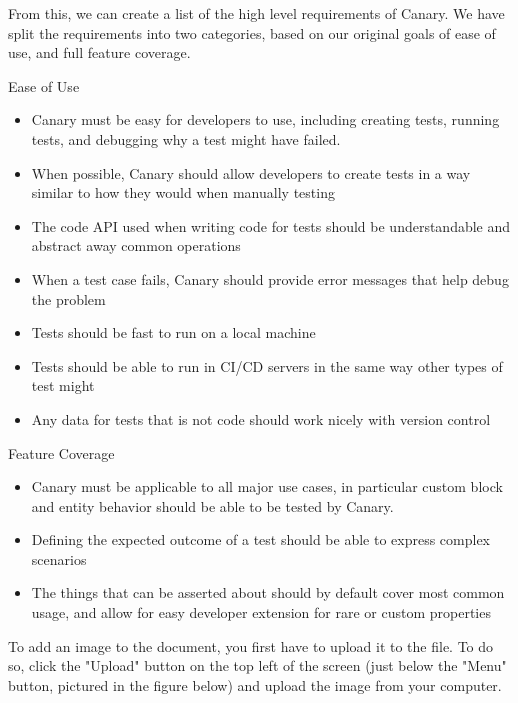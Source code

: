 \documentclass{article}
\begin{document}
\begin{doublespacing}
From this, we can create a list of the high level requirements of Canary. We have split the requirements into two categories, based on our original goals of ease of use, and full feature coverage.

\noindent Ease of Use 
\begin{itemize}
  \item Canary must be easy for developers to use, including creating tests, running tests, and debugging why a test might have failed.
  \item When possible, Canary should allow developers to create tests in a way similar to how they would when manually testing
  \item The code API used when writing code for tests should be understandable and abstract away common operations
  \item When a test case fails, Canary should provide error messages that help debug the problem
  \item Tests should be fast to run on a local machine
  \item Tests should be able to run in CI/CD servers in the same way other types of test might
  \item Any data for tests that is not code should work nicely with version control
\end{itemize}
\noindent Feature Coverage

\begin{itemize}
  \item Canary must be applicable to all major use cases, in particular custom block and entity behavior should be able to be tested by Canary.
  \item Defining the expected outcome of a test should be able to express complex scenarios
  \item The things that can be asserted about should by default cover most common usage, and allow for easy developer extension for rare or custom properties
\end{itemize}

\par To add an image to the document, you first have to upload it to the file. To do so, click the "Upload" button on the top left of the screen (just below the "Menu" button, pictured in the figure below) and upload the image from your computer. 


\end{doublespacing}
\end{document}
